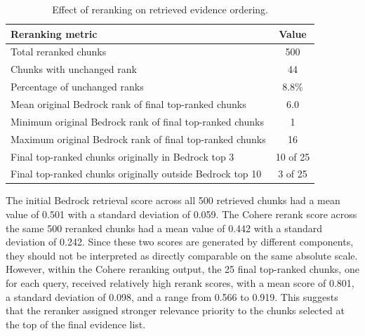 \begin{table}[!t]
\centering
\caption{Effect of reranking on retrieved evidence ordering.}
\label{tab:reranking_effect}
\begin{tabular}{lc}
\hline
\textbf{Reranking metric} & \textbf{Value} \\
\hline
Total reranked chunks & 500 \\
Chunks with unchanged rank & 44 \\
Percentage of unchanged ranks & 8.8\% \\
Mean original Bedrock rank of final top-ranked chunks & 6.0 \\
Minimum original Bedrock rank of final top-ranked chunks & 1 \\
Maximum original Bedrock rank of final top-ranked chunks & 16 \\
Final top-ranked chunks originally in Bedrock top 3 & 10 of 25 \\
Final top-ranked chunks originally outside Bedrock top 10 & 3 of 25 \\
\hline
\end{tabular}
\end{table}


The initial Bedrock retrieval score across all 500 retrieved chunks had a mean value of 0.501 with a standard deviation of 0.059. The Cohere rerank score across the same 500 reranked chunks had a mean value of 0.442 with a standard deviation of 0.242. Since these two scores are generated by different components, they should not be interpreted as directly comparable on the same absolute scale. However, within the Cohere reranking output, the 25 final top-ranked chunks, one for each query, received relatively high rerank scores, with a mean score of 0.801, a standard deviation of 0.098, and a range from 0.566 to 0.919. This suggests that the reranker assigned stronger relevance priority to the chunks selected at the top of the final evidence list.

